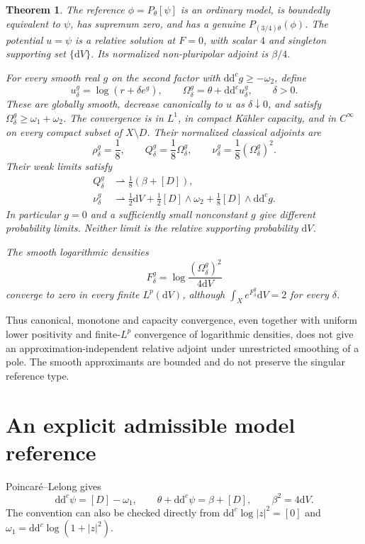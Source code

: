 \documentclass[11pt]{article}
\newtheorem{theorem}{Theorem}[section]
\newcommand{\ddc}{\mathrm d\mathrm d^c}
\begin{document}
\begin{theorem}\label{thm:obstruction}
The reference $\phi=P_\theta[\psi]$ is an ordinary model, is boundedly
equivalent to $\psi$, has supremum zero, and has a genuine
$P_{(3/4)\theta}(\phi)$. The potential $u=\psi$ is a relative solution
at $F=0$, with scalar $4$ and singleton supporting set $\{\mathrm dV\}$.
Its normalized non-pluripolar adjoint is $\beta/4$.

For every smooth real $g$ on the second factor with
$\ddc g\ge-\omega_2$, define
\[
 u_\delta^g=\log(r+\delta e^g),\qquad
 \Omega_\delta^g=\theta+\ddc u_\delta^g,\qquad \delta>0.
\]
These are globally smooth, decrease canonically to $u$ as
$\delta\downarrow0$, and satisfy $\Omega_\delta^g\ge\omega_1+\omega_2$.
The convergence is in $L^1$, in compact K\"ahler capacity, and in
$C^\infty$ on every compact subset of $X\setminus D$.
Their normalized classical adjoints are
\[
 \rho_\delta^g=\frac18,\qquad
 Q_\delta^g=\frac18\Omega_\delta^g,\qquad
 \nu_\delta^g=\frac18(\Omega_\delta^g)^2.
\]
Their weak limits satisfy
\begin{align}
 Q_\delta^g&\rightharpoonup\frac18(\beta+[D]),\label{eq:currentlimit}\\
 \nu_\delta^g&\rightharpoonup
 \frac12\mathrm dV+\frac12[D]\wedge\omega_2
                         +\frac18[D]\wedge\ddc g.\label{eq:measurelimit}
\end{align}
In particular $g=0$ and a sufficiently small nonconstant $g$ give
different probability limits. Neither limit is the relative supporting
probability $\mathrm dV$.

The smooth logarithmic densities
\[
 F_\delta^g=\log\frac{(\Omega_\delta^g)^2}{4\mathrm dV}
\]
converge to zero in every finite $L^p(\mathrm dV)$, although
$\int_Xe^{F_\delta^g}\mathrm dV=2$ for every $\delta$.
\end{theorem}

Thus canonical, monotone and capacity convergence, even together with
uniform lower positivity and finite-$L^p$ convergence of logarithmic
densities, does not give an approximation-independent relative adjoint
under unrestricted smoothing of a pole. The smooth approximants are
bounded and do not preserve the singular reference type.

\section{An explicit admissible model reference}

Poincar\'e--Lelong gives
\begin{equation}\label{eq:PL}
 \ddc\psi=[D]-\omega_1,\qquad
 \theta+\ddc\psi=\beta+[D],\qquad \beta^2=4\mathrm dV.
\end{equation}
The convention can also be checked directly from
$\ddc\log|z|^2=[0]$ and $\omega_1=\ddc\log(1+|z|^2)$.
\end{document}
